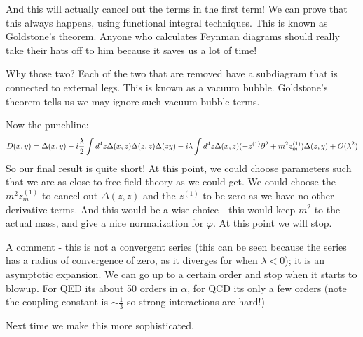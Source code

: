 And this will actually cancel out the terms in the first term! We can prove that this always happens, using functional integral techniques. This is known as Goldstone's theorem. Anyone who calculates Feynman diagrams should really take their hats off to him because it saves us a lot of time!

Why those two? Each of the two that are removed have a subdiagram that is connected to external legs. This is known as a vacuum bubble. Goldstone's theorem tells us we may ignore such vacuum bubble terms.

Now the punchline: 
\begin{equation}
   D(x, y) = \Delta(x, y) - i\frac{\lambda}{2}\int d^4z \Delta(x, z)\Delta(z, z)\Delta(z y) - i\lambda \int d^4z \Delta(x, z)(-z^{(1)}\partial^2 + m^2 z^{(1)}_m)\Delta(z, y) + O(\lambda^2)
\end{equation}
So our final result is quite short! At this point, we could choose parameters such that we are as close to free field theory as we could get. We could choose the $m^2 z^{(1)}_m$ to cancel out $\Delta(z, z)$ and the $z^{(1)}$ to be zero as we have no other derivative terms. And this would be a wise choice - this would keep $m^2$ to the actual mass, and give a nice normalization for $\varphi$. At this point we will stop.

A comment - this is not a convergent series (this can be seen because the series has a radius of convergence of zero, as it diverges for when $\lambda < 0$); it is an asymptotic expansion. We can go up to a certain order and stop when it starts to blowup. For QED its about 50 orders in $\alpha$, for QCD its only a few orders (note the coupling constant is $\sim \frac{1}{3}$ so strong interactions are hard!)

Next time we make this more sophisticated.
